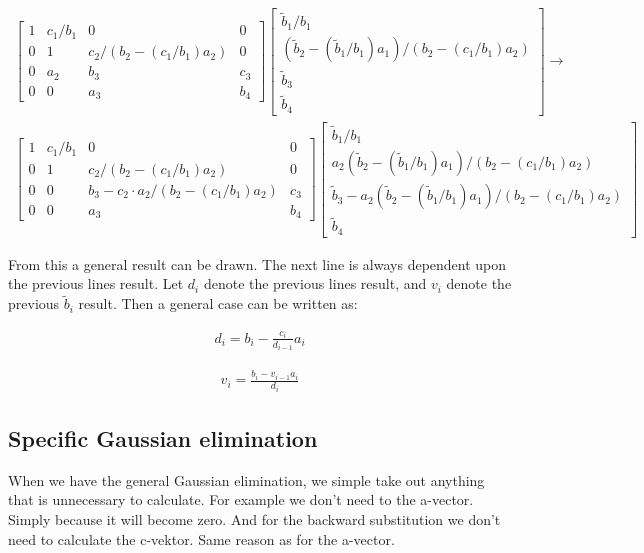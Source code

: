\documentclass[12pt,norsk,a4paper]{article}
\begin{document}
\begin{align*}
\begin{bmatrix}
1 & c_1/b_1 & 0 & 0 \\ 
0 & 1 & c_2/(b_2-(c_1/b_1)a_2) & 0 \\ 
0 & a_2 & b_3 & c_3 \\ 
0 & 0 & a_3 & b_4
\end{bmatrix}
\begin{bmatrix}
\tilde{b}_1/b_1 \\ 
(\tilde{b}_2-(\tilde{b}_1/b_1)a_1)/(b_2-(c_1/b_1)a_2)\\ 
\tilde{b}_3 \\ 
\tilde{b}_4
\end{bmatrix}\to\\
\begin{bmatrix}
1 & c_1/b_1 & 0 & 0 \\ 
0 & 1 & c_2/(b_2-(c_1/b_1)a_2) & 0 \\ 
0 & 0 & b_3-c_2\cdot a_2/(b_2-(c_1/b_1)a_2) & c_3 \\ 
0 & 0 & a_3 & b_4
\end{bmatrix}
\begin{bmatrix}
\tilde{b}_1/b_1 \\ 
a_2(\tilde{b}_2-(\tilde{b}_1/b_1)a_1)/(b_2-(c_1/b_1)a_2)\\ 
\tilde{b}_3-a_2(\tilde{b}_2-(\tilde{b}_1/b_1)a_1)/(b_2-(c_1/b_1)a_2) \\ 
\tilde{b}_4
\end{bmatrix}
\end{align*}


From this a general result can be drawn. The next line is always dependent upon the previous lines result. 
Let $d_i$ denote the previous lines result, and $v_i$ denote the previous $\tilde{b}_i$ result. Then a general case can be written as:

\begin{align}
	d_i=b_i-\frac{c_i}{d_{i-1}}a_i\label{di}
\end{align}

\begin{align}
	v_i=\frac{b_i-v_{i-1}a_i}{d_i}\label{vi}
\end{align}


\subsection{Specific Gaussian elimination}

When we have the general Gaussian elimination, we simple take out anything that is unnecessary to calculate. For example we don't need to the a-vector. Simply because it will become zero. And for the backward substitution we don't need to calculate the c-vektor. Same reason as for the a-vector.  
\end{document}
